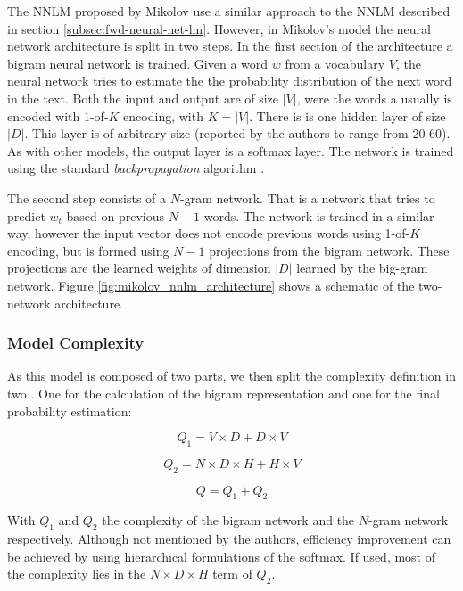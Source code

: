 The \ac{NNLM} proposed by Mikolov use a similar  approach to the
\ac{NNLM} described  in section \ref{subsec:fwd-neural-net-lm}. However, in  Mikolov's  model  the neural
network architecture is split in two steps. In the first section of  the
architecture  a bigram  neural network is trained. Given a word $w$ from a vocabulary $V$, the neural
network tries to estimate the the probability distribution of the next word
in the text. Both the input and output are of size $|V|$, were the words a
usually is encoded with 1-of-$K$ encoding, with $K=|V|$.  There is is one hidden layer of
size $|D|$. This layer is of  arbitrary size (reported by the authors  to
range from 20-60). As with other models, the output layer  is a  softmax
layer. The network is trained  using the standard \textit{backpropagation}
algorithm \cite{conf/icassp/MikolovKBGC09}. 

The second step consists of a  $N$-gram network. That is a network that tries to predict $w_t$ based on previous $N-1$ words. 
The network is trained in a 
similar way, however the input vector does not encode previous words using 1-of-$K$ encoding, but is formed using $N-1$ projections from
the  bigram network. These projections are the learned weights of dimension
$|D|$ learned by the big-gram network. Figure
\ref{fig:mikolov_nnlm_architecture} shows a schematic of the two-network architecture.


\subsubsection{Model Complexity}

As this model is composed of two parts, we then split the complexity
definition in two . One for the calculation of the bigram representation and
one for the final probability estimation:

\begin{equation} Q_1 = V \times D + D \times V  \end{equation}

\begin{equation} Q_2 =  N \times D \times H + H \times V   \end{equation}

\begin{equation} Q = Q_1 + Q_2
\end{equation}

With $Q_1$ and $Q_2$ the complexity of the bigram network and the $N$-gram
network respectively. Although not mentioned by the authors, efficiency
improvement can be achieved by using hierarchical formulations of the softmax. If used, most of the complexity  lies in the  $N \times D \times
H$ term of $Q_2$.

